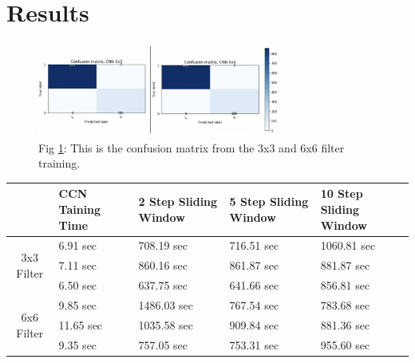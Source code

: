 \documentclass[a4paper,10pt]{article}
\begin{document}

\section{Results}

\begin{figure}[t]
	\label{confusion_matrix}
	\small
	\includegraphics[width=8cm]{confusion_matrix.png}
	\\Fig \ref{confusion_matrix}: This is the confusion matrix from the 3x3 and 6x6 filter training.
	\centering
\end{figure}



\begin{center}
	\begin{tabular}{ |c|p{1.5cm}|p{2.25cm}|p{2.25cm}|p{2.25cm}| } 
		
		\hline
		 & CCN Taining Time & 2 Step Sliding Window & 5 Step Sliding Window & 10 Step Sliding Window \\
		\hline
		\multirow{3}{4em}{3x3 Filter} & 6.91 sec & 708.19 sec & 716.51 sec & 1060.81 sec \\ 
		
		& 7.11 sec & 860.16 sec & 861.87 sec & 881.87 sec  \\ 
		& 6.50 sec & 637.75 sec & 641.66 sec & 856.81 sec \\ 
		\hline
		\multirow{3}{4em}{6x6 Filter} & 9.85 sec & 1486.03 sec & 767.54 sec & 783.68 sec \\ 
		& 11.65 sec & 1035.58 sec & 909.84 sec & 881.36 sec \\ 
		& 9.35 sec & 757.05 sec & 753.31 sec & 955.60 sec \\ 
		\hline
	\end{tabular}
\end{center}
\end{document}
